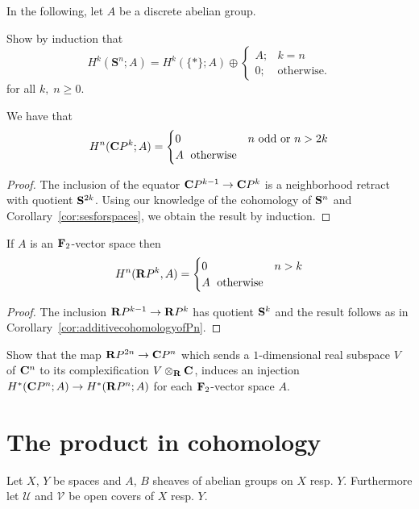 \documentclass[a4paper,openany]{scrbook}
\begin{document}
In the following, let $A$ be a discrete abelian group.
\begin{exer}\label{exer:cohomologyofspheres}
Show by induction that 
\[
H^k(\mathbf S^n;A) = H^k(\{*\};A) \oplus \begin{cases} A;& k=n\\ 0;& \text{otherwise.}\end{cases}
\]
for all $k,\;n \geq 0$.
\end{exer}

\begin{corollary}\label{cor:additivecohomologyofPn}
We have that
\[
H^n(\CP^k;A) = \begin{cases} 0\; & n \text{ odd or } n>2k\\ A\; \text{ otherwise}\end{cases}
\]
\end{corollary}
\begin{proof}
The inclusion of the equator $\CP^{k-1} \to \CP^k$ is a neighborhood retract with quotient $\S^{2k}$. Using our knowledge of the cohomology of $\S^n$ and Corollary~\ref{cor:sesforspaces}, we obtain the result by induction.
\end{proof}

\begin{corollary}\label{cor:additivecohomologyofRPn}
If $A$ is an $\F_2$-vector space then
\[
H^n(\R P^k,A) = \begin{cases} 0\; & n > k\\ A\; \text{ otherwise}\end{cases}
\]
\end{corollary}
\begin{proof}
The inclusion $\R P^{k-1} \to \R P^k$ has quotient $\S^k$ and the result follows as in Corollary~\ref{cor:additivecohomologyofPn}. 
\end{proof}

\begin{exer}\label{exer:complexificationincohomology}
Show that the map $\R P^{2n} \to \CP^n$ which sends a $1$-dimensional real subspace $V$ of $\CC^n$ to its complexification $V \otimes_\R \CC$, induces an injection $H^*(\CP^n;A) \to H^*(\R P^n;A)$ for each $\F_2$-vector space $A$.
\end{exer}

\section{The product in cohomology}

Let $X$, $Y$ be spaces and $A$, $B$ sheaves of abelian groups on $X$ resp. $Y$. Furthermore let $\mathcal U$ and $\mathcal V$ be open covers of $X$ resp. $Y$. 
\end{document}
